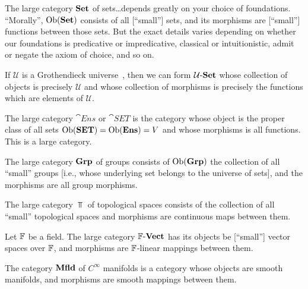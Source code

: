 \begin{node}[Category]
\begin{node}[Examples]\label{cat-0007}%
\begin{node}\label{cat-0004}%
The large category $\mathbf{Set}$ of sets\dots depends greatly on your choice of
foundations. ``Morally'', $\operatorname{Ob}(\mathbf{Set})$ consists of all [``small''] sets, and its
morphisms are [``small''] functions between those sets. But the exact
details varies depending on whether our foundations is predicative or
impredicative, classical or intuitionistic, admit or negate the axiom of
choice, and so on.
\end{node}

\begin{node}\label{cat-000A}%
If $\mathcal{U}$ is a Grothendieck universe~, then we can
form $\mathcal{U}\mbox{-}\mathbf{Set}$ whose collection of objects is precisely
$\mathcal{U}$ and whose collection of morphisms is precisely the
functions which are elements of $\mathcal{U}$.
\end{node}

\begin{node}\label{cat-0005}%
The large category $\cat{Ens}$ or $\cat{SET}$ is the category whose object is
the proper class of all sets $\operatorname{Ob}(\mathbf{SET})=\operatorname{Ob}(\mathbf{Ens})=V$ and whose
morphisms is all functions. This is a large category.
\end{node}

\begin{node}\label{cat-0003}%
The large category $\mathbf{Grp}$ of groups consists of $\operatorname{Ob}(\mathbf{Grp})$ the collection of all
``small'' groups [i.e., whose underlying set belongs to the universe of
sets], and the morphisms are all group morphisms.
\end{node}

\begin{node}\label{cat-0006}%
The large category $\Top$ of topological spaces consists of the collection of
all ``small'' topological spaces and morphisms are continuous maps
between them.
\end{node}

\begin{node}\label{cat-0008}%
Let $\mathbb{F}$ be a field. The large category $\mathbb{F}\textrm{-}\mathbf{Vect}$ has its objects be
[``small''] vector spaces over $\mathbb{F}$, and morphisms are $\mathbb{F}$-linear
mappings between them.
\end{node}

\begin{node}\label{cat-000F}%
The category $\mathbf{Mfld}$ of $C^{\infty}$ manifolds is a category whose
objects are smooth manifolds, and morphisms are smooth mappings between
them. 
\end{node}


\end{node}
\end{node}
